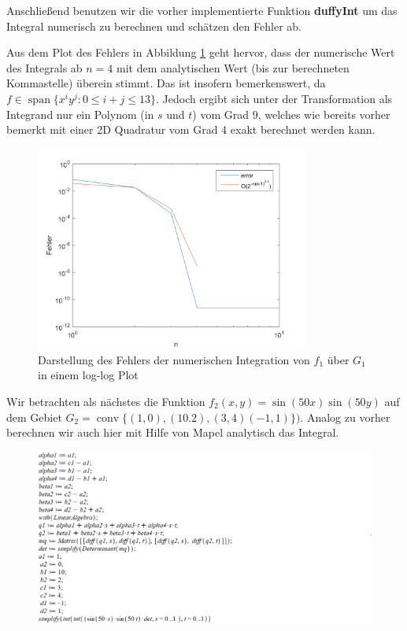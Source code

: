\documentclass[a4paper,11pt,bibliography=totoc,listof=totoc,headinclude=true,cleardoublepage=empty,oneside]{scrbook}
\DeclareMathOperator*{\SPAN}{span}
\DeclareMathOperator*{\conv}{conv}
\begin{document}
\noindent Anschließend benutzen wir die vorher implementierte Funktion \textbf{duffyInt} um das Integral numerisch zu berechnen und schätzen den Fehler ab. 

\begin{minipage}{\textwidth}
	{\color{change}
		}
\end{minipage}


\noindent Aus dem Plot des Fehlers in Abbildung \ref{fig:3_5_1} geht hervor, dass der numerische Wert des Integrals ab $n=4$ mit dem analytischen Wert (bis zur berechneten Kommastelle) überein stimmt. Das ist insofern bemerkenswert, da $f\in \SPAN\{x^iy^j:0 \leq i+j\leq 13 \} $. Jedoch ergibt sich unter der Transformation als Integrand nur ein Polynom (in $s$ und $t$) vom Grad 9, welches wie bereits vorher bemerkt mit einer 2D Quadratur vom Grad 4 exakt berechnet werden kann.

\begin{figure}[h]
	\centering
	\includegraphics[width=0.8\textwidth]{plot_3_5_1.png}
	\caption{Darstellung des Fehlers der numerischen Integration von $f_1$ über $G_1$ in einem log-log Plot}
	\label{fig:3_5_1}
\end{figure}


\pagebreak
Wir betrachten als nächstes die Funktion $f_2(x,y)=\sin(50x)\sin(50y)$ auf dem Gebiet $G_2=\conv\{(1,0),(10.2),(3,4)(-1,1)\})$. Analog zu vorher berechnen wir auch hier mit Hilfe von Mapel analytisch das Integral. 

\begin{figure}[h]
	\centering
	\includegraphics[width=\textwidth]{mw_3_5_2.png}
\end{figure}
\end{document}
